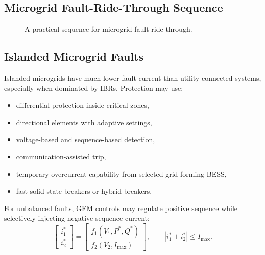 \documentclass[11pt]{article}
\begin{document}
\subsection{Microgrid Fault-Ride-Through Sequence}
\begin{figure}[h]
\centering
{}
\caption{A practical sequence for microgrid fault ride-through.}
\end{figure}

\subsection{Islanded Microgrid Faults}
Islanded microgrids have much lower fault current than utility-connected
systems, especially when dominated by IBRs. Protection may use:
\begin{itemize}
  \item differential protection inside critical zones,
  \item directional elements with adaptive settings,
  \item voltage-based and sequence-based detection,
  \item communication-assisted trip,
  \item temporary overcurrent capability from selected grid-forming BESS,
  \item fast solid-state breakers or hybrid breakers.
\end{itemize}
For unbalanced faults, GFM controls may regulate positive sequence while
selectively injecting negative-sequence current:
\begin{equation}
\begin{bmatrix}i_1^*\\i_2^*\end{bmatrix}
=
\begin{bmatrix}
f_1(V_1,P^*,Q^*)\\
f_2(V_2,I_{\max})
\end{bmatrix},
\qquad |i_1^*+i_2^*|\le I_{\max}.
\end{equation}
\end{document}
